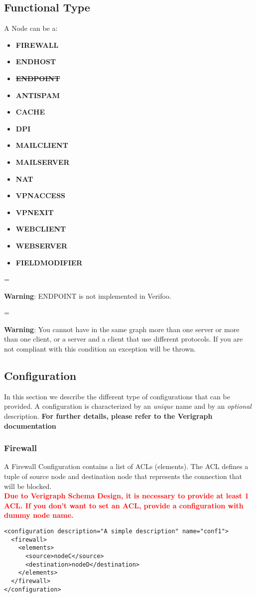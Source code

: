 \documentclass[a4paper,11pt]{article}
\newenvironment{warning}
  {\par\begin{mdframed}[backgroundcolor=mypink,linewidth=2pt,linecolor=red]%
    \begin{list}{}{\leftmargin=1cm
                   \labelwidth=\leftmargin}\item[\Large\ding{43}]}
  {\end{list}\end{mdframed}\par}
\begin{document}
\subsection*{Functional Type}
A Node can be a:
\begin{itemize}[noitemsep]
    \item \textbf{FIREWALL}
    \item \textbf{ENDHOST}
    \item \textbf{\sout{ENDPOINT}}
    \item \textbf{ANTISPAM}
    \item \textbf{CACHE}
    \item \textbf{DPI}
    \item \textbf{MAILCLIENT}
    \item \textbf{MAILSERVER}
    \item \textbf{NAT}
    \item \textbf{VPNACCESS}
    \item \textbf{VPNEXIT}
    \item \textbf{WEBCLIENT}
    \item \textbf{WEBSERVER}
    \item \textbf{FIELDMODIFIER}
\end{itemize}
\begin{warning}
\textbf{Warning}: ENDPOINT is not implemented in Verifoo.
\end{warning}
\begin{warning}
\textbf{Warning}: You cannot have in the same graph more than one server or more than one client, or a server and a client that use different protocols. If you are not compliant with this condition an exception will be thrown.
\end{warning}
\subsection*{Configuration}
In this section we describe the different type of configurations that can be provided.
A configuration is characterized by an \textit{unique} name and by an \textit{optional} description. \textbf{For further details, please refer to the Verigraph documentation}
\subsubsection*{Firewall}
A Firewall Configuration contains a list of ACLs (elements).
The ACL defines a tuple of source node and destination node that represents the connection that will be blocked.\\
\textcolor{red}{\textbf{Due to Verigraph Schema Design, it is necessary to provide at least 1 ACL. If you don't want to set an ACL, provide a configuration with dummy node name.}}
\begin{lstlisting}[label={list:forth},caption=Firewall Configuration Example]
<configuration description="A simple description" name="conf1">
  <firewall>
    <elements>
      <source>nodeC</source>
      <destination>nodeD</destination>
    </elements>
  </firewall>
</configuration>
\end{lstlisting}
\end{document}
